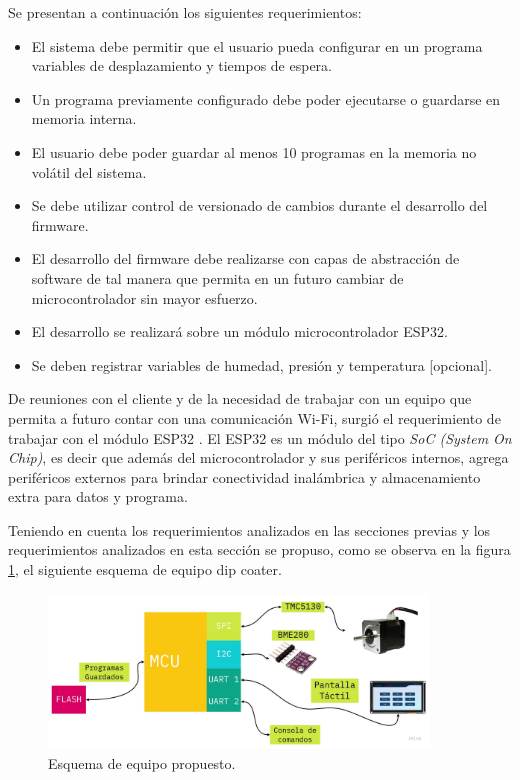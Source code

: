 Se presentan a continuación los siguientes requerimientos:
\begin{itemize}

\item El sistema debe permitir que el usuario pueda configurar en un programa variables de desplazamiento y tiempos de espera.
\item Un programa previamente configurado debe poder ejecutarse o guardarse en memoria interna.
\item El usuario debe poder guardar al menos 10 programas en la memoria no volátil del sistema.
\item Se debe utilizar control de versionado de cambios durante el desarrollo del firmware.
\item El desarrollo del firmware debe realizarse con capas de abstracción de software de tal manera que permita en un futuro cambiar de microcontrolador sin mayor esfuerzo.
\item El desarrollo se realizará sobre un módulo microcontrolador ESP32.
\item Se deben registrar variables de humedad, presión y temperatura [opcional].
\end{itemize}

De reuniones con el cliente y de la necesidad de trabajar con un equipo que permita a futuro contar con una comunicación Wi-Fi, surgió el requerimiento de trabajar con el módulo ESP32 \citep{web_esp}.
El ESP32 es un módulo del tipo \textit{SoC (System On Chip)}, es decir que además del microcontrolador y sus periféricos internos, agrega periféricos externos para brindar conectividad inalámbrica y almacenamiento extra para datos y programa.
  

Teniendo en cuenta los requerimientos analizados en las secciones previas y los requerimientos analizados en esta sección se propuso, como se observa en la figura \ref{fig:equipo_propuesto}, el siguiente esquema de equipo dip coater.  


\begin{figure}[ht]
\centering 
\includegraphics[width=0.9\textwidth]{./Figures/cap2_esquema_propuesto.jpg}
\caption{Esquema de equipo propuesto.}
\label{fig:equipo_propuesto}
\end{figure}

